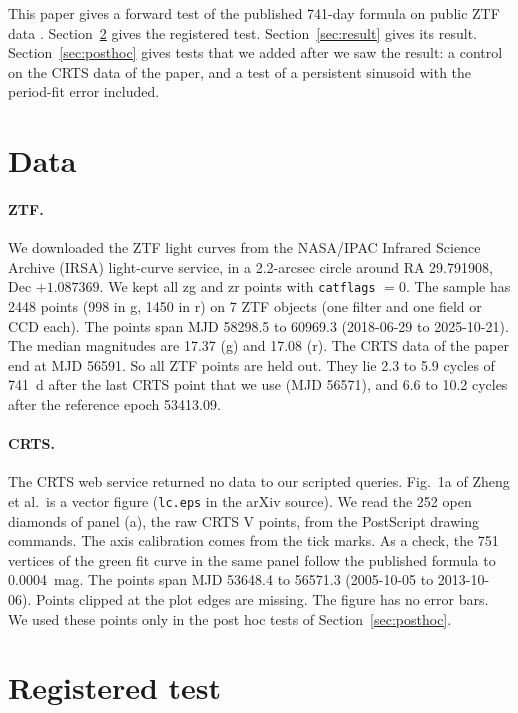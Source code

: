 \documentclass[11pt]{article}
\begin{document}
This paper gives a forward test of the published 741-day formula on public ZTF data \cite{bellm2019,masci2019}. Section~\ref{sec:method} gives the registered test. Section~\ref{sec:result} gives its result. Section~\ref{sec:posthoc} gives tests that we added after we saw the result: a control on the CRTS data of the paper, and a test of a persistent sinusoid with the period-fit error included.

\section{Data}

\paragraph{ZTF.} We downloaded the ZTF light curves from the NASA/IPAC Infrared Science Archive (IRSA) light-curve service, in a 2.2-arcsec circle around RA 29.791908, Dec $+1.087369$. We kept all zg and zr points with \texttt{catflags} $= 0$. The sample has 2448 points (998 in g, 1450 in r) on 7 ZTF objects (one filter and one field or CCD each). The points span MJD 58298.5 to 60969.3 (2018-06-29 to 2025-10-21). The median magnitudes are 17.37 (g) and 17.08 (r). The CRTS data of the paper end at MJD 56591. So all ZTF points are held out. They lie 2.3 to 5.9 cycles of 741~d after the last CRTS point that we use (MJD 56571), and 6.6 to 10.2 cycles after the reference epoch 53413.09.

\paragraph{CRTS.} The CRTS web service returned no data to our scripted queries. Fig.~1a of Zheng et al.\ is a vector figure (\texttt{lc.eps} in the arXiv source). We read the 252 open diamonds of panel (a), the raw CRTS V points, from the PostScript drawing commands. The axis calibration comes from the tick marks. As a check, the 751 vertices of the green fit curve in the same panel follow the published formula to 0.0004~mag. The points span MJD 53648.4 to 56571.3 (2005-10-05 to 2013-10-06). Points clipped at the plot edges are missing. The figure has no error bars. We used these points only in the post hoc tests of Section~\ref{sec:posthoc}.

\section{Registered test}
\label{sec:method}
\end{document}
